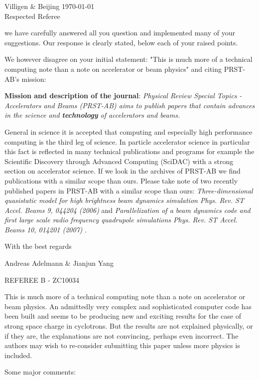 \documentclass[10pt]{report}
\begin{document}
 Villigen \& Beijing \today \\
 
 Respected Referee
 
 we have carefully answered all you question and implemented many
 of your suggestions. Our response is clearly stated, below each of your raised points.
 
 We however disagree on your initial statement: "This is much more of a technical computing note than a note on accelerator or
 beam physics" and citing PRST-AB's  mission: 
 
 {\bf Mission and description of the journal}:
{\em Physical Review Special Topics - Accelerators and Beams (PRST-AB) aims to publish papers that contain advances in 
the science and {\bf technology} of accelerators and beams. }
 
General in science it is accepted that computing and especially high performance computing is the third leg of science. In particle accelerator science in particular this fact
is reflected in many technical publications and programs for example the Scientific Discovery through Advanced Computing (SciDAC) with a strong section on accelerator science. If we look in the archives of 
PRST-AB we find publications with a similar scope than ours. Please take note of two recently published papers in PRST-AB with a similar scope than ours: 
{\em Three-dimensional quasistatic model for high brightness beam dynamics simulation Phys. Rev. ST Accel. Beams 9, 044204 (2006)} and 
{ \em Parallelization of a beam dynamics code and first large scale radio frequency quadrupole simulations Phys. Rev. ST Accel. Beams 10, 014201 (2007)} .

With the best regards
  
Andreas Adelmann \& Jianjun Yang
  
\pagebreak  
REFEREE B - ZC10034
 
 This is much more of a technical computing note than a note on accelerator or
 beam physics. An admittedly very complex and sophisticated computer code has
 been built and seems to be producing new and exciting results for the case of
 strong space charge in cyclotrons. But the results are not explained
 physically, or if they are, the explanations are not convincing, perhaps even
 incorrect. The authors may wish to re-consider submitting this paper unless
 more physics is included.
 
 Some major comments:
 
\end{document}
